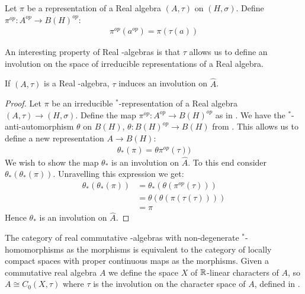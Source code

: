\begin{definition}\label{oppositerep}
	Let $\pi$ be a representation of a Real \Cstar algebra $(A,\tau)$ on $(H,\sigma)$. Define $\pi^{op}:A^{op}\to B(H)^{op}$:
	\begin{align*}
		\pi^{op}(a^{op})=\pi(\tau(a))
	\end{align*}
\end{definition}
An interesting property of Real \Cstar-algebras is that $\tau$ allows us to define an involution on the space of irreducible representations of a Real algebra. 
\begin{proposition}\label{involution}
	If $(A,\tau)$ is a Real \Cstar-algebra, $\tau$ induces an involution on $\hat{A}$. 
\end{proposition}
\begin{proof}
	Let $\pi$ be an irreducible $^*$-representation of a Real algebra $(A,\tau)\to (H,\sigma)$. Define the map $\pi^{op}: A^{op} \to B(H)^{op}$ as in . We have the $^*$-anti-automorphism $\theta$ on $B(H)$, $\theta:B(H)^{op}\to B(H)$ from . This allows us to define a new representation $A\to B(H)$:
	\begin{align*}
		\theta_*(\pi)=\theta\pi^{op}(\tau))
	\end{align*}
	We wish to show the map $\theta_*$ is an involution on $\hat{A}$. To this end consider $\theta_*(\theta_*(\pi))$. Unravelling this expression we get:
	\begin{align*}
		\theta_*(\theta_*(\pi))&=\theta_*(\theta(\pi^{op}(\tau))) \\
		&=\theta(\theta(\pi(\tau(\tau)))) \\
		&=\pi
	\end{align*}
	Hence $\theta_*$ is an involution on $\hat{A}$. 
\end{proof}
\begin{theorem}\label{gelfandnaimark}
	The category of real commutative \Cstar-algebras with non-degenerate $^*$-homomorphisms as the morphisms is equivalent to the category of locally compact spaces with proper continuous maps as the morphisms. Given a commutative real \Cstar algebra $A$ we define the space $X$ of $\mathbb{R}$-linear characters of $A$, so $A \cong C_0(X,\tau)$ where $\tau$ is the involution on the character space of $A$, defined in .
\end{theorem}

